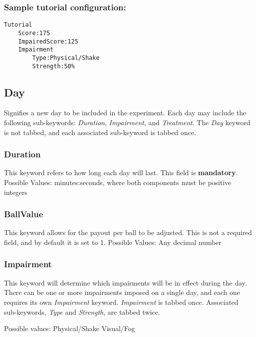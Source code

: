 \documentclass{article}
\begin{document}
\subsubsection{Sample tutorial configuration:}
\begin{lstlisting}
Tutorial
    Score:175
    ImpairedScore:125
    Impairment
        Type:Physical/Shake
        Strength:50%
\end{lstlisting}

\subsection{Day}
Signifies a new day to be included in the experiment. Each day may include the following sub-keywords: \textit{Duration}, \textit{Impairment}, and \textit{Treatment}. The \textit{Day} keyword is not tabbed, and each associated sub-keyword is tabbed once.

\subsubsection{Duration}
This keyword refers to how long each day will last. This field is \textbf{mandatory}. \newline
\indent Possible Values: \newline
\indent\indent minutes:seconds, where both components must be positive integers

\subsubsection{BallValue}
This keyword allows for the payout per ball to be adjusted. This is not a required field, and by default it is set to 1. \newline
\indent Possible Values: \newline
\indent\indent Any decimal number

\subsubsection{Impairment}
This keyword will determine which impairments will be in effect during the day. There can be one or more impairments imposed on a single day, and each one requires its own \textit{Impairment} keyword. \textit{Impairment} is tabbed once. Associated sub-keywords, \textit{Type} and \textit{Strength}, are tabbed twice. \newline

 \newline
\indent Possible values: \newline
\indent\indent Physical/Shake \newline
\indent\indent Visual/Fog \newline
\end{document}

